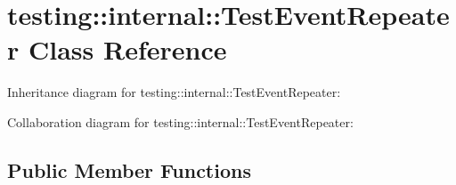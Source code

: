 \hypertarget{classtesting_1_1internal_1_1TestEventRepeater}{}\section{testing\+:\+:internal\+:\+:Test\+Event\+Repeater Class Reference}
\label{classtesting_1_1internal_1_1TestEventRepeater}


Inheritance diagram for testing\+:\+:internal\+:\+:Test\+Event\+Repeater\+:


Collaboration diagram for testing\+:\+:internal\+:\+:Test\+Event\+Repeater\+:
\subsection*{Public Member Functions}

